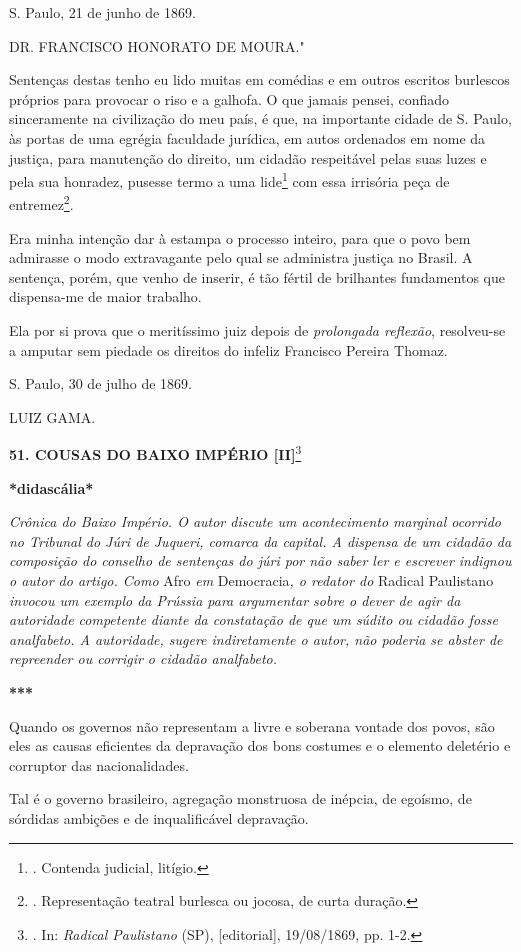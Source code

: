S. Paulo, 21 de junho de 1869.

DR. FRANCISCO HONORATO DE MOURA."

Sentenças destas tenho eu lido muitas em comédias e em outros escritos
burlescos próprios para provocar o riso e a galhofa. O que jamais
pensei, confiado sinceramente na civilização do meu país, é que, na
importante cidade de S. Paulo, às portas de uma egrégia faculdade
jurídica, em autos ordenados em nome da justiça, para manutenção do
direito, um cidadão respeitável pelas suas luzes e pela sua honradez,
pusesse termo a uma lide\footnote{. Contenda judicial, litígio.} com
essa irrisória peça de entremez\footnote{. Representação teatral
  burlesca ou jocosa, de curta duração.}.

Era minha intenção dar à estampa o processo inteiro, para que o povo bem
admirasse o modo extravagante pelo qual se administra justiça no Brasil.
A sentença, porém, que venho de inserir, é tão fértil de brilhantes
fundamentos que dispensa-me de maior trabalho.

Ela por si prova que o meritíssimo juiz depois de \emph{prolongada
reflexão}, resolveu-se a amputar sem piedade os direitos do infeliz
Francisco Pereira Thomaz.

S. Paulo, 30 de julho de 1869.

LUIZ GAMA.

\textbf{51. COUSAS DO BAIXO IMPÉRIO {[}II{]}}\footnote{. In:
  \emph{Radical Paulistano} (SP), {[}editorial{]}, 19/08/1869, pp. 1-2.}

\textbf{*didascália*}

\emph{Crônica do Baixo Império. O autor discute um acontecimento
marginal ocorrido no Tribunal do Júri de Juqueri, comarca da capital. A
dispensa de um cidadão da composição do conselho de sentenças do júri
por não saber ler e escrever indignou o autor do artigo. Como} Afro
\emph{em} Democracia\emph{, o redator do} Radical Paulistano
\emph{invocou um exemplo da Prússia para argumentar sobre o dever de
agir da autoridade competente diante da constatação de que um súdito ou
cidadão fosse analfabeto. A autoridade, sugere indiretamente o autor,
não poderia se abster de repreender ou corrigir o cidadão analfabeto.}

\textbf{***}

Quando os governos não representam a livre e soberana vontade dos povos,
são eles as causas eficientes da depravação dos bons costumes e o
elemento deletério e corruptor das nacionalidades.

Tal é o governo brasileiro, agregação monstruosa de inépcia, de egoísmo,
de sórdidas ambições e de inqualificável depravação.

